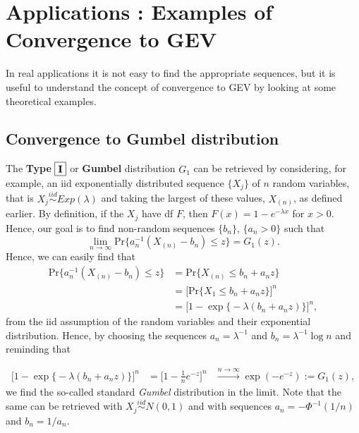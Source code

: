 \section{Applications : Examples of Convergence to GEV}\label{sec::appconcrete}

In real applications it is not easy to find the appropriate sequences, but it is useful to understand the concept of convergence to GEV by looking at some theoretical examples.


\subsection*{Convergence to Gumbel distribution}
The \textbf{Type}  $\boxed{\textbf{\text{I}}}$ or \textbf{Gumbel} distribution $G_1$ can be retrieved by considering, for example, an iid exponentially distributed sequence $\{X_j\}$ of $n$ random variables, that is $X_j\stackrel{iid}{\sim}Exp(\lambda)$ and taking the largest of these values, $X_{(n)}$, as defined earlier. By definition, if the $X_j$ have df $F$, then $F(x)=1-e^{-\lambda x}$ for $x>0$. Hence, our goal is to find non-random sequences $\{b_n\}$, $\{a_n>0\}$ such that 
\begin{equation}
\displaystyle{\lim_{n \to \infty}}\text{Pr}\Big\{ a_n^{-1}(X_{(n)}-b_n)\leq z\Big\}=G_1(z).
\end{equation}
Hence, we can easily find that
\begin{equation*}
\begin{aligned}
\text{Pr}\Big\{ a_n^{-1}(X_{(n)}-b_n)\leq z\Big\}
&=\text{Pr}\big\{X_{(n)}\leq b_n+a_nz\big\} \\ &=\Big[\text{Pr}\{X_1\leq b_n+a_nz\}\Big]^n \\
&=\Big[1-\exp\big\{-\lambda(b_n+a_nz)\big\}\Big]^n,
\end{aligned}
\end{equation*}
from the iid assumption of the random variables and their exponential distribution.
Hence, by choosing  the sequences $a_n=\lambda^{-1}$ and $b_n=\lambda^{-1}\log n$ and reminding that%


\begin{equation*}
\begin{aligned}
\Big[1-\exp\big\{-\lambda(b_n+a_nz)\big\}\Big]^n 
& = \Big[1-\frac{1}{n}e^{-z}\Big]^n %
& \stackrel{n\to\infty}{\longrightarrow} \exp(-e^{-z}):=G_1(z),
\end{aligned}
\end{equation*}
we find the so-called standard \emph{Gumbel} distribution in the limit. 
Note that the same can be retrieved with $X_j\stackrel{iid}{\sim}N(0,1)$ and with sequences $a_n=-\Phi^{-1}(1/n)$ and $b_n=1/a_n$. 

